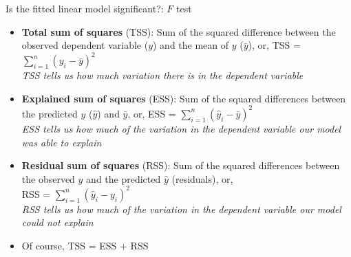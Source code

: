 \documentclass[xcolor=x11names,handout,compress]{beamer}
\renewcommand{\(}{\begin{columns}}
\renewcommand{\)}{\end{columns}}
\newcommand{\<}[1]{\begin{column}{#1}}
\renewcommand{\>}{\end{column}}
\begin{document}
\begin{frame}{Is the fitted linear model significant?: $F$ test}

\begin{itemize}[<+->]\itemsep6pt

\item {\bf Total sum of squares} (TSS): Sum of the squared difference between the observed dependent variable ($y$) and the mean of $y$ ($\bar{y}$), or,		
 TSS = $\sum_{i=1}^{n}(y_i - \bar{y})^2$\\
{\it TSS tells us how much variation there is in the dependent variable}

\item {\bf Explained sum of squares} (ESS): Sum of the squared 
differences between the predicted $y$ ($\hat{y}$) and $\bar{y}$, or,
ESS = $\sum_{i=1}^{n} (\hat{y}_i - \bar{y})^2$\\

{\it ESS tells us how much of the variation in the dependent variable 
our model was able to explain}

\item {\bf Residual sum of squares} (RSS): Sum of the squared 
differences between the observed $y$ and the predicted $\hat{y}$ (residuals), or, \\

RSS = $\sum_{i=1}^{n} (\hat{y}_i - y_i)^2$\\

{\it RSS tells us how much of the variation in the dependent variable 
our model could not explain}

\item Of course, TSS = ESS + RSS

\end{itemize}

\end{frame}
\end{document}
